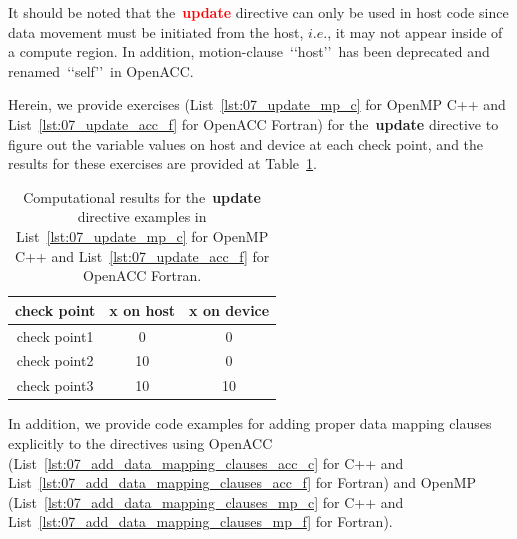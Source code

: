 


\par
It should be noted that the~\textbf{\textcolor{red}{update}} directive can only be used in host code since data movement must be initiated from the host, $i.e.$, it may not appear inside of a compute region.
In addition, motion-clause~\lq\lq host\rq\rq~has been deprecated and renamed~\lq\lq self\rq\rq~in OpenACC.


\par
Herein, we provide exercises (List~\ref{lst:07_update_mp_c} for OpenMP C++ and List~\ref{lst:07_update_acc_f} for OpenACC Fortran) for the~\textbf{update} directive to figure out the variable values on host and device at each check point, and the results for these exercises are provided at Table~\ref{tbl:solution_update_directive}.








\begin{table}[!h]
\centering\caption{Computational results for the~\textbf{update} directive examples in List~\ref{lst:07_update_mp_c} for OpenMP C++ and List~\ref{lst:07_update_acc_f} for OpenACC Fortran.}\label{tbl:solution_update_directive}
\begin{tabular}{ |  c  |  c  |  c  | } 
\hline
check point & x on host & x on device \\
\hline
check point1 & 0 & 0 \\
check point2 & 10 & 0 \\
check point3 & 10 & 10 \\
\hline
\end{tabular}
\end{table}


\par
In addition, we provide code examples for adding proper data mapping clauses explicitly to the directives using OpenACC (List~\ref{lst:07_add_data_mapping_clauses_acc_c} for C++ and List~\ref{lst:07_add_data_mapping_clauses_acc_f} for Fortran) and OpenMP (List~\ref{lst:07_add_data_mapping_clauses_mp_c} for C++ and List~\ref{lst:07_add_data_mapping_clauses_mp_f} for Fortran).


